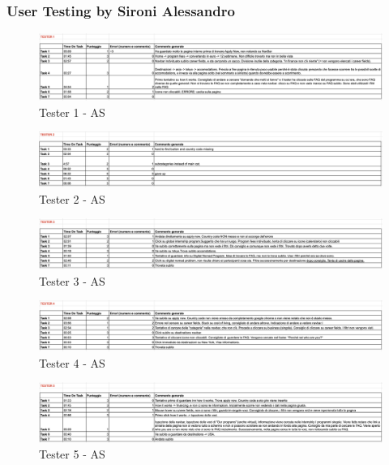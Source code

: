 \documentclass[11pt]{article} %
\begin{document}
\subsubsection{User Testing by Sironi Alessandro}

\begin{figure}[H]
  \centering
  \includegraphics[width=\textwidth]{Images/Test/TestAS1.png}
  \caption{Tester 1 - AS}
\end{figure}

\begin{figure}[H]
  \centering
  \includegraphics[width=\textwidth]{Images/Test/TestAS2.png}
  \caption{Tester 2 - AS}
\end{figure}

\begin{figure}[H]
  \centering
  \includegraphics[width=\textwidth]{Images/Test/TestAS3.png}
  \caption{Tester 3 - AS}
\end{figure}

\begin{figure}[H]
  \centering
  \includegraphics[width=\textwidth]{Images/Test/TestAS4.png}
  \caption{Tester 4 - AS}
\end{figure}

\begin{figure}[H]
  \centering
  \includegraphics[width=\textwidth]{Images/Test/TestAS5.png}
  \caption{Tester 5 - AS}
\end{figure}
\end{document}
